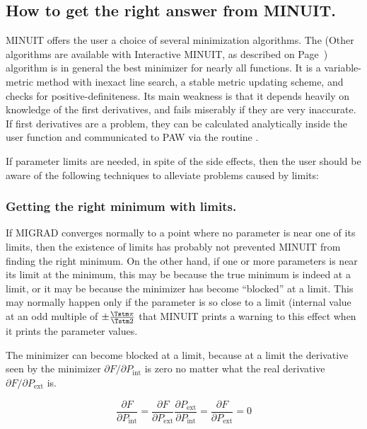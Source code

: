 \subsection{How to get the right answer from MINUIT.}

MINUIT offers the user a choice of several minimization algorithms.
The  (Other algorithms are available with 
Interactive MINUIT, as described on Page~\pageref{sec:H2MWMIN})
algorithm is in general the best minimizer for nearly all functions. 
It is a 
variable-metric method with inexact line search, a stable
metric updating scheme, and checks for positive-definiteness.
Its main weakness is that it depends heavily on knowledge of the
first derivatives, and fails miserably if they are very inaccurate.
If first derivatives are a problem, they can be
calculated analytically inside the user function and communicated
to PAW via the routine .

If parameter limits are needed, in spite of the side effects,
then the user should be aware of the following
techniques to alleviate problems caused by limits:

\subsubsection*{Getting the right minimum with limits.}

If MIGRAD converges normally to a point where no parameter is
near one of its limits, then the existence of limits has
probably not prevented MINUIT from finding the right minimum.
On the other hand, if one or more parameters is near its limit
at the minimum, this may be because the true minimum is indeed
at a limit, or it may be because the minimizer has become 
``blocked'' at a limit.  
This may normally happen only if the parameter
is so close to a limit (internal value at an odd multiple
of \(\pm \frac{\Tstm \pi}{\Tstm 2}\) that MINUIT prints a warning to this effect
when it prints the parameter values.

The minimizer can become blocked at a limit, because at a limit
the derivative seen by the minimizer 
\(\partial F / \partial P_{\mathrm{int}}\)
is zero no matter what the real derivative
\(\partial F / \partial P_{\mathrm{ext}}\) is.

\[
\frac{\partial F}{\partial P_{\mathrm{int}}}                =
\frac{\partial F}{\partial P_{\mathrm{ext}}}
\frac{\partial P_{\mathrm{ext}}}{\partial P_{\mathrm{int}}} =
\frac{\partial F}{\partial P_{\mathrm{ext}}}                = 0
\]

